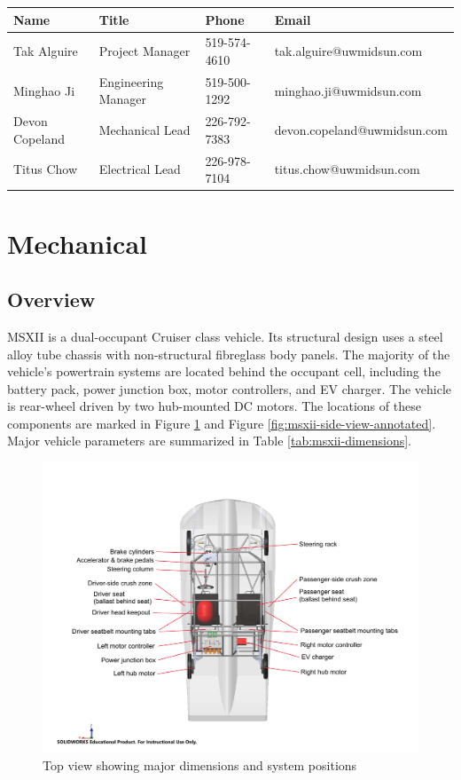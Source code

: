 \documentclass[10pt]{article}
\begin{document}
\begin{table}[!h]
\centering
\begin{tabular}{llll}
\toprule
Name            & Title               & Phone        & Email \\
\midrule
Tak Alguire     & Project Manager     & 519-574-4610 & tak.alguire@uwmidsun.com \\
Minghao Ji      & Engineering Manager & 519-500-1292 & minghao.ji@uwmidsun.com \\
Devon Copeland  & Mechanical Lead     & 226-792-7383 & devon.copeland@uwmidsun.com \\
Titus Chow      & Electrical Lead     & 226-978-7104 & titus.chow@uwmidsun.com \\
\bottomrule
\end{tabular}
\end{table}

\section{Mechanical}
\subsection{Overview}
MSXII is a dual-occupant Cruiser class vehicle. Its structural design uses a steel alloy tube chassis with non-structural fibreglass body panels. The majority of the vehicle's powertrain systems are located behind the occupant cell, including the battery pack, power junction box, motor controllers, and EV charger. The vehicle is rear-wheel driven by two hub-mounted DC motors. The locations of these components are marked in Figure \ref{fig:msxii-top-view-annotated} and Figure \ref{fig:msxii-side-view-annotated}. Major vehicle parameters are summarized in Table \ref{tab:msxii-dimensions}.

\begin{figure}
\centering
\includegraphics[width=\textwidth]{figures/msxii-top-view-annotated}
\caption{Top view showing major dimensions and system positions}
\label{fig:msxii-top-view-annotated}
\end{figure}
\end{document}

